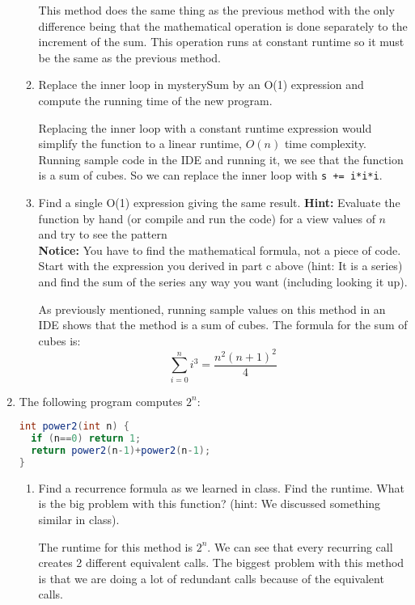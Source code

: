 \documentclass[letterpaper, 11pt]{article}
\begin{document}
\begin{enumerate}[leftmargin=*]
\begin{enumerate}
This method does the same thing as the previous method with the only difference being that the mathematical operation is done separately to the increment of the sum. This operation runs at constant runtime so it must be the same as the previous method.

    \item Replace the inner loop in mysterySum by an O(1) expression and compute the running time of the new program.

    Replacing the inner loop with a constant runtime expression would simplify the function to a linear runtime, $O(n)$ time complexity. Running sample code in the IDE and running it, we see that the function is a sum of cubes. So we can replace the inner loop with \texttt{s += i*i*i}.
    
    \item Find a single O(1) expression giving the same result. \textbf{Hint:} Evaluate the function by hand (or compile and run the code) for a view values of $n$ and try to see the pattern\\
    \textbf{Notice:} You have to find the mathematical formula, not a piece of code. Start with the expression you derived in part c above (hint: It is a series) and find the sum of the series any way you want (including looking it up).

    As previously mentioned, running sample values on this method in an IDE shows that the method is a sum of cubes. The formula for the sum of cubes is:
    \[\sum_{i=0}^{n} i^3 = \frac{n^2\left(n+1\right)^2}{4}\]

    \end{enumerate}

    \item The following program computes $2^n$:
\begin{tcolorbox}
\begin{lstlisting}[language=Java]
int power2(int n) {
  if (n==0) return 1;
  return power2(n-1)+power2(n-1);
}
\end{lstlisting}
\end{tcolorbox}

\begin{enumerate}
    \item Find a recurrence formula as we learned in class. Find the runtime. What is the big problem with this function? (hint: We discussed something similar in class).

    The runtime for this method is $2^n$. We can see that every recurring call creates 2 different equivalent calls. The biggest problem with this method is that we are doing a lot of redundant calls because of the equivalent calls.


\end{enumerate}
\end{enumerate}
\end{document}
